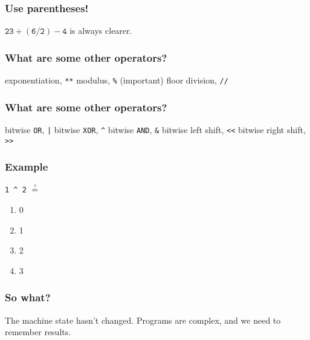 \documentclass[11pt]{beamer}
\begin{document}
\begin{frame}
  \frametitle{Use parentheses!}
  \Enlarge

  $\mathtt{23 + \left(6 / 2\right) - 4}$ is always clearer.
\end{frame}

\begin{frame}
  \frametitle{What are some other operators?}
  \Enlarge

  \begin{itemize}
  \myitem  exponentiation, \texttt{**} \pause
  \myitem  modulus, \texttt{\%}  (important) \pause
  \myitem  floor division, \texttt{//}
  \end{itemize}
\end{frame}

\begin{frame}
  \frametitle{What are some other operators?}
  \Enlarge

  \begin{itemize}
  \myitem  bitwise \texttt{OR}, \texttt{|}
  \myitem  bitwise \texttt{XOR}, \texttt{\^{}}
  \myitem  bitwise \texttt{AND}, \texttt{\&}
  \myitem  bitwise left shift, \texttt{<{}<}
  \myitem  bitwise right shift, \texttt{>{}>}
  \end{itemize}
\end{frame}

\begin{frame}
  \frametitle{Example}
  \Enlarge

  \texttt{1 \^{} 2} $\overset{?}{=}$
  \\
  \begin{enumerate}[label=\Alph*]
  \item  0
  \item  1
  \item  2
  \item  3
  \end{enumerate}
\end{frame}


\begin{frame}
  \frametitle{So what?}
  \Enlarge

  \begin{itemize}
  \myitem  The machine state hasn't changed. \pause
  \myitem  Programs are complex, and we need to remember results.
  \end{itemize}
\end{frame}
\end{document}

